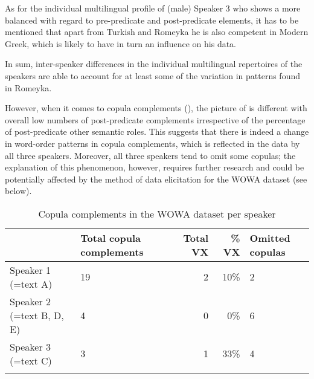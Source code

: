 \documentclass[output=paper,colorlinks,citecolor=brown]{langscibook}
\begin{document}
As for the individual multilingual profile of (male) Speaker 3 who shows a more balanced  with regard to pre-predicate and post-predicate elements, it has to be mentioned that apart from Turkish and Romeyka he is also competent in Modern Greek, which is likely to have in turn an influence on his data.

In sum, inter-speaker differences in the individual multilingual repertoires of the speakers are able to account for at least some of the variation in  patterns found in Romeyka.

However, when it comes to copula complements (), the picture of  is different with overall low numbers of post-predicate complements irrespective of the percentage of post-predicate other semantic roles. This suggests that there is indeed a change in word-order patterns in copula complements, which is reflected in the data by all three speakers. Moreover, all three speakers tend to omit some copulas; the explanation of this phenomenon, however, requires further research and could be potentially affected by the method of data elicitation for the WOWA dataset (see below).

\begin{table}
\begin{tabularx}{\textwidth}{lYrrY}
\lsptoprule
 & Total copula complements & Total VX & \% VX & Omitted copulas \\
\midrule
Speaker 1 (=text A) & 19 & 2 & 10\% & 2 \\
Speaker 2 (=text B, D, E) & 4 & 0 & 0\% & 6 \\
Speaker 3 (=text C) & 3 & 1 & 33\% & 4 \\
\lspbottomrule
\end{tabularx}
    \caption{Copula complements in the WOWA dataset per speaker}
    \label{Romeyka:tab:5}
\end{table}
\end{document}
